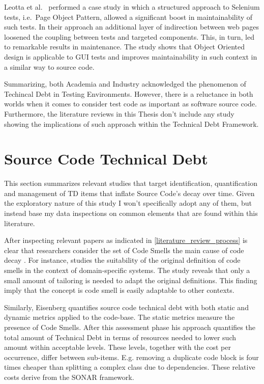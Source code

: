 Leotta et al.\ \cite{pageObjectPattern} performed a case study in which a structured approach to Selenium tests, i.e.\ Page Object Pattern, allowed a significant boost in maintainability of such tests. In their approach an additional layer of indirection between web pages loosened the coupling between tests and targeted components. This, in turn, led to remarkable results in maintenance. The study shows that Object Oriented design is applicable to GUI tests and improves maintainability in such context in a similar way to source code.

Summarizing, both Academia and Industry acknowledged the phenomenon of Techincal Debt in Testing Environments. However, there is a reluctance in both worlds when it comes to consider test code as important as software source code. Furthermore, the literature reviews in this Thesis don't include any study showing the implications of such approach within the Technical Debt Framework.

\section{Source Code Technical Debt} \label{source_code_technical_debt}

This section summarizes relevant studies that target identification, quantification and management of TD items that inflate Source Code's decay over time. Given the exploratory nature of this study I won't specifically adopt any of them, but instead base my data inspections on common elements that are found within this literature.

After inspecting relevant papers as indicated in \ref{literature_review_process} is clear that researchers consider the set of Code Smells \cite{code_smell_definition} the main cause of code decay \cite{mapping_study_td}. For instance, \cite{domain_specific_code_smells} studies the suitability of the original definition of code smells in the context of domain-specific systems. The study reveals that only a small amount of tailoring is needed to adapt the original definitions. This finding imply that the concept is code smell is easily adaptable to other contexts. 

Similarly, Eisenberg \cite{threshold_approach_to_td} quantifies source code technical debt with both static and dynamic metrics applied to the code-base. The static metrics measure the presence of Code Smells. After this assessment phase his approach quantifies the total amount of Technical Debt in terms of resources needed to lower such amount within acceptable levels. These levels, together with the cost per occurrence, differ between sub-items. E.g. removing a duplicate code block is four times cheaper than splitting a complex class due to dependencies. These relative costs derive from the SONAR \cite{sonar_evaluate_td} framework.

